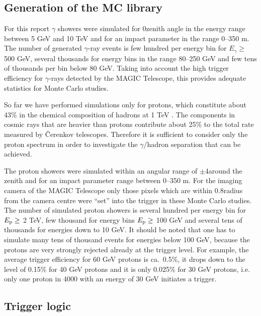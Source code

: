 \subsection{Generation of the MC library}

\medskip For this report 
$\gamma$ showers were simulated for  0\tdeg zenith
angle in the energy range between 5 GeV and 10 TeV and for
an impact parameter in the range 0--350 m. The number of generated
$\gamma$-ray events is few hundred per energy bin for $E_{\gamma}\geq$ 500
GeV, several thousands for energy bins in the range  80--250 GeV
and few tens of thousands per bin below 80 GeV. Taking into account
the high trigger efficiency for $\gamma$-rays detected by
the MAGIC Telescope, this provides 
adequate statistics for Monte Carlo studies.
        
So far we have performed simulations only for protons, which
constitute about 43\% in the chemical composition of hadrons at 1 TeV
\cite{wiebel:94}. The components in cosmic rays
that are heavier than protons
contribute about 25\% to the total rate measured by \v{C}erenkov telescopes.
Therefore it is sufficient to consider only the proton spectrum 
in order to investigate the
$\gamma$/hadron separation that can be achieved.

The proton showers were simulated within an angular range of
$\pm$4\tdeg around the zenith and for an impact parameter range between
0--350 m. For the imaging camera of the MAGIC Telescope only those pixels
which are within 0.8\tdeg radius from the camera centre were ``set''
into the trigger in these Monte Carlo studies. The number of simulated
proton showers is several hundred per energy bin for $E_{\rm p}\geq$ 2
TeV, few thousand for energy bins $E_{\rm p}\geq$ 100 GeV and several
tens of thousands for energies down to 10 GeV. It should be noted
that one has to simulate many tens of thousand events for energies
below 100 GeV, because the protons are very strongly rejected
already at the trigger level. For example, the average trigger
efficiency for 60 GeV protons is ca.~0.5\%, it drops down to the
level of 0.15\% for 40 GeV protons and it is only 0.025\% for 30
GeV protons, i.e. only one proton in 4000 with an  energy of 30 GeV
initiates a trigger.

\subsection{Trigger logic}

